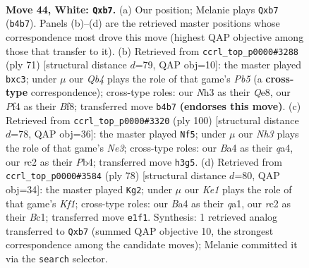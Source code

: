 \documentclass[11pt]{article}
\begin{document}
\clearpage

\begin{figure}[p]\centering
\begin{subfigure}{0.46\textwidth}\centering
\resizebox{\linewidth}{!}{%
\newchessgame
\chessboard[
  setfen={2b3k1/1q3p1p/6p1/4Pp2/BQ3P2/7N/P1r3PP/1n2K3 w - - 0 44},
  showmover=false,
  pgfstyle=straightmove, color=movearrow, markmove={b4-b7}
]}
\caption{}
\end{subfigure}\hfill
\begin{subfigure}{0.46\textwidth}\centering
\resizebox{\linewidth}{!}{%
\newchessgame
\chessboard[
  setfen={4qbk1/3p2p1/3P3p/P1p5/1p5P/2Q2PP1/3B2K1/4R3 b - - 0 36},
  showmover=false,
  pgfstyle=straightmove, color=movearrow, markmove={b4-c3}
]}
\caption{}
\end{subfigure}
\\[4pt]
\begin{subfigure}{0.46\textwidth}\centering
\resizebox{\linewidth}{!}{%
\newchessgame
\chessboard[
  setfen={8/1p3ppk/p3b2p/3pQ3/qP4P1/2P1N2P/5P1K/8 w - - 0 51},
  showmover=false,
  pgfstyle=straightmove, color=movearrow, markmove={e3-f5}
]}
\caption{}
\end{subfigure}\hfill
\begin{subfigure}{0.46\textwidth}\centering
\resizebox{\linewidth}{!}{%
\newchessgame
\chessboard[
  setfen={5bk1/5pp1/4p2p/4P3/1nQ4P/1P4P1/5P2/q1B1NK2 w - - 3 40},
  showmover=false,
  pgfstyle=straightmove, color=movearrow, markmove={f1-g2}
]}
\caption{}
\end{subfigure}
\caption{\textbf{Move 44, White: \texttt{Qxb7}.} (a) Our position; Melanie plays \texttt{Qxb7} (\texttt{b4b7}). Panels (b)--(d) are the retrieved master positions whose correspondence most drove this move (highest QAP objective among those that transfer to it). (b) Retrieved from \texttt{ccrl\_top\_p0000\#3288} (ply 71) [structural distance $d$=79, QAP obj=10]: the master played \texttt{bxc3}; under $\mu$ our \emph{Qb4} plays the role of that game's \emph{Pb5} (a \textbf{cross-type} correspondence); cross-type roles: our \emph{N}h3 as their \emph{Q}e8, our \emph{P}f4 as their \emph{B}f8; transferred move \texttt{b4b7} \textbf{(endorses this move)}. (c) Retrieved from \texttt{ccrl\_top\_p0000\#3320} (ply 100) [structural distance $d$=78, QAP obj=36]: the master played \texttt{Nf5}; under $\mu$ our \emph{Nh3} plays the role of that game's \emph{Ne3}; cross-type roles: our \emph{B}a4 as their \emph{q}a4, our \emph{r}c2 as their \emph{P}b4; transferred move \texttt{h3g5}. (d) Retrieved from \texttt{ccrl\_top\_p0000\#3584} (ply 78) [structural distance $d$=80, QAP obj=34]: the master played \texttt{Kg2}; under $\mu$ our \emph{Ke1} plays the role of that game's \emph{Kf1}; cross-type roles: our \emph{B}a4 as their \emph{q}a1, our \emph{r}c2 as their \emph{B}c1; transferred move \texttt{e1f1}. Synthesis: 1 retrieved analog transferred to \texttt{Qxb7} (summed QAP objective 10, the strongest correspondence among the candidate moves); Melanie committed it via the \texttt{search} selector.}
\label{fig:thought-m86}
\end{figure}
\end{document}
